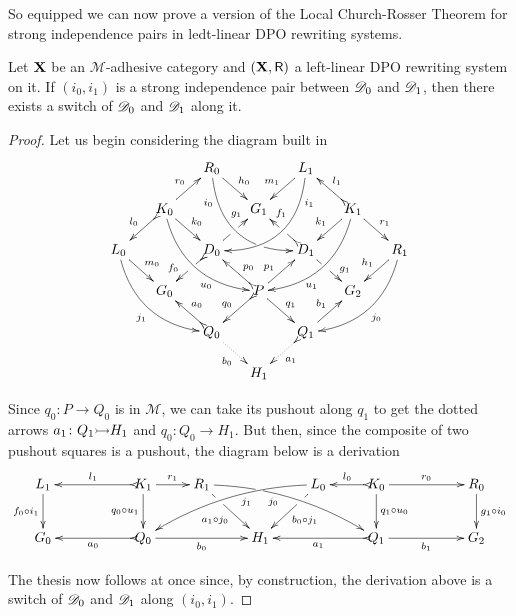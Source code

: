 So equipped we can now prove a version of the Local Church-Rosser Theorem for strong independence pairs in ledt-linear DPO rewriting systems.

\begin{theorem}\label{prChurch} Let $\textbf {\textup{X}}$ be an $\mathcal{M}$-adhesive category and $(\textbf {\textup{X}}, \mathsf{R})$ a left-linear DPO rewriting system on it. If $(i_0, i_1)$ is a strong independence pair
	between $\mathscr{D}_0$ and $\mathscr{D}_1$, then there exists a switch of $\mathscr{D}_0$ and $\mathscr{D}_1$ along it.
\end{theorem}
\begin{proof}
	Let us begin considering the diagram
	built in 
	\[\xymatrix@C=15pt@R=15pt{&&R_0
		\ar@/_.8cm/[ddrr]_(.2){i_0}|(.7)\hole \ar[dr]^{h_0}&&
		L_1\ar@/^.8cm/[ddll]^(.2){i_1}
		\ar[dl]_{m_1}\\&K_0\ar[dr]^{k_0}\ar@{>->}[dl]_{l_0}
		\ar@/_.6cm/[ddrr]_(.65){u_0}\ar[ur]^{r_0}&& G_1 && K_1
		\ar@/^.6cm/[ddll]^(.65){u_1}\ar[dl]_{k_1}\ar@{>->}[lu]_{l_1}
		\ar[dr]^{r_1}\\L_0 \ar[dr]^{m_0} \ar@{>}@/_.6cm/[ddrr]_{j_1}&& D_0
		\ar@{>->}[dl]|(.42)\hole_(.64){f_0}\ar[ur]|(.48)\hole^(.7){g_1}&&D_1
		\ar[dr]|(.42)\hole^(.65){g_1}
		\ar@{>->}[ul]|(.48)\hole_(.7){f_1}&&R_1\ar@/^.6cm/[ddll]^{j_0}\ar[dl]_{h_1}\\&G_0
		&&P\ar[dr]^{q_1}
		\ar@{>->}[dl]_{q_0}\ar[ur]^(.4){p_1}\ar@{>->}[ul]_(.4){p_0}&&G_2\\&&Q_0
		\ar@{>->}@{>->}[ul]_{a_0} \ar@{.>}[dr]_{b_0} &&Q_1\ar[ur]^{b_1}
		\ar@{>.>}[dl]^{a_1} \\ &&&H_1 }\] 
		
		Since $q_0\colon P\to Q_0$ is in
	$\mathcal{M}$, we can take its pushout along $q_1$ to get the dotted
	arrows $a_1\colon Q_1\mto H_1$ and $q_0\colon Q_0\to H_1$. But then,
	since the composite of two pushout squares is a pushout, the diagram
	below is a derivation
	\[\xymatrix{L_1 \ar[d]_{f_0 \circ i_1}&& K_1
		\ar[d]_{q_0\circ u_1}\ar@{>->}[ll]_{l_1} \ar[r]^{r_1} & R_1
		\ar@/^.35cm/[drrr]|(.31)\hole_(.4){j_0} \ar[dr]|(.3)\hole_{a_1\circ
			j_0} && L_0 \ar@/_.35cm/[dlll]^(.4){j_1} \ar[dl]|(.3)\hole^{b_0\circ
			j_1}& K_0 \ar[d]^{q_1\circ u_0}\ar@{>->}[l]_{l_0} \ar[rr]^{r_0} && R_0
		\ar[d]^{g_1\circ i_0} \\G_0 && \ar@{>->}[ll]^{a_0} Q_0 \ar[rr]_{b_0}&&
		H_1 && \ar@{>->}[ll]^{a_1} Q_1 \ar[rr]_{b_1}&& G_2}\] 
		
		The thesis now follows at once since, by construction, the derivation above is a switch of $\mathscr{D}_0$ and $\mathscr{D}_1$ along	$(i_0, i_1)$.
\end{proof}


